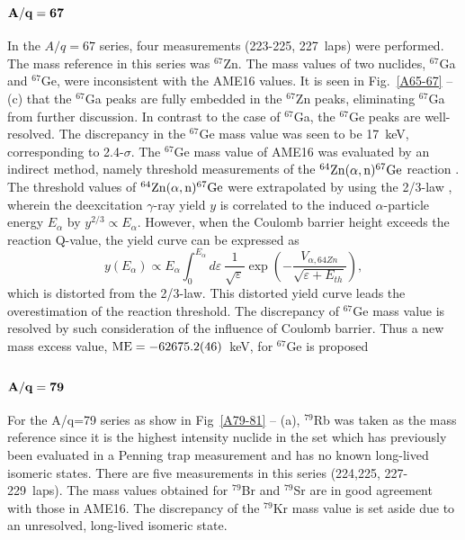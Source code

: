 \documentclass[3p]{elsarticle}
\begin{document}
\subsection{${\bf A/q = 67}$}
In the $A/q=67$ series, four measurements (223-225, 227~laps) were performed. The mass reference in this series was $^{67}$Zn. The mass values of two nuclides, $^{67}$Ga and $^{67}$Ge, were inconsistent with the AME16 values. It is seen in Fig.~\ref{A65-67} -- (c) that the $^{67}$Ga peaks are fully embedded in the $^{67}$Zn peaks, eliminating $^{67}$Ga from further discussion. In contrast to the case of $^{67}$Ga, the $^{67}$Ge peaks are well-resolved. The discrepancy in the $^{67}$Ge mass value was seen to be 17~keV, corresponding to 2.4-$\sigma$. The $^{67}$Ge mass value of AME16 was evaluated by an indirect method, namely threshold measurements of the $^{64}{\rm Zn}( \alpha,{\rm n})^{67}{\rm Ge}$ reaction \citep{Murphy1978,Al-Naser1979}. The threshold values of $^{64}{\rm Zn}( \alpha,{\rm n})^{67}{\rm Ge}$ were extrapolated by using the 2/3-law \cite{Bondelid1964}, wherein the deexcitation $\gamma$-ray yield $y$ is correlated to the induced $\alpha$-particle energy $E_{\alpha}$ by $y^{2/3} \propto E_{\alpha}$.  However, when the Coulomb barrier height exceeds the reaction Q-value, the yield curve can be expressed as
\begin{equation}
y(E_{\alpha}) \propto E_{\alpha} \int_{0}^{E_{\alpha}} d\varepsilon \ \frac{1}{\sqrt{\varepsilon}} \exp(-\frac{V_{\alpha, 64Zn}}{\sqrt{\varepsilon+E_{th}}}),
\end{equation}
which is distorted from the 2/3-law. This distorted yield curve leads the overestimation of the reaction threshold. The discrepancy of $^{67}$Ge mass value is resolved by such consideration of the influence of Coulomb barrier. Thus a new mass excess value, ${\rm ME} = -62675.2(46)$~keV, for $^{67}$Ge is proposed

\subsection{${\bf A/q = 79}$}
For the A/q=79 series as show in Fig~\ref{A79-81} -- (a), $^{79}$Rb was taken as the mass reference since it is the highest intensity nuclide in the set which has previously been evaluated in a Penning trap measurement \citep{Kellerbauer2007} and has no known long-lived isomeric states. There are five measurements in this series (224,225, 227-229~laps). The mass values obtained for $^{79}$Br and $^{79}$Sr are in good agreement with those in AME16. The discrepancy of the $^{79}$Kr mass value is set aside due to an unresolved, long-lived isomeric state. 
\end{document}
